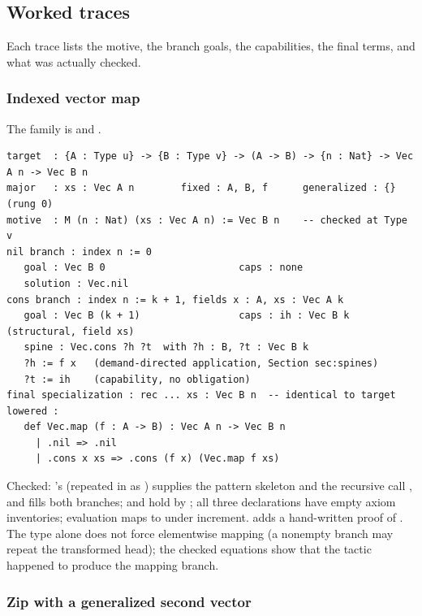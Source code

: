 \subsection{Worked traces}\label{alg:rec-traces}

Each trace lists the motive, the branch goals, the capabilities, the final terms, and what was actually checked.

\subsubsection{Indexed vector map}

The family is  and .
\begin{lstlisting}
target  : {A : Type u} -> {B : Type v} -> (A -> B) -> {n : Nat} -> Vec A n -> Vec B n
major   : xs : Vec A n        fixed : A, B, f      generalized : {} (rung 0)
motive  : M (n : Nat) (xs : Vec A n) := Vec B n    -- checked at Type v
nil branch : index n := 0
   goal : Vec B 0                       caps : none
   solution : Vec.nil
cons branch : index n := k + 1, fields x : A, xs : Vec A k
   goal : Vec B (k + 1)                 caps : ih : Vec B k  (structural, field xs)
   spine : Vec.cons ?h ?t  with ?h : B, ?t : Vec B k
   ?h := f x   (demand-directed application, Section sec:spines)
   ?t := ih    (capability, no obligation)
final specialization : rec ... xs : Vec B n  -- identical to target
lowered :
   def Vec.map (f : A -> B) : Vec A n -> Vec B n
     | .nil => .nil
     | .cons x xs => .cons (f x) (Vec.map f xs)
\end{lstlisting}
Checked: 's  (repeated in  as ) supplies the pattern skeleton and the recursive call , and  fills both branches;  and  hold by ; all three declarations have empty axiom inventories; evaluation maps \code{[1, 2]} to \code{[2, 3]} under increment.  adds a hand-written proof of . The type alone does not force elementwise mapping (a nonempty branch may repeat the transformed head); the checked  equations show that the tactic happened to produce the mapping branch.

\subsubsection{Zip with a generalized second vector}

